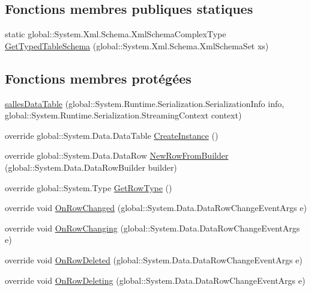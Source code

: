 \subsection*{Fonctions membres publiques statiques}
\begin{DoxyCompactItemize}
\item 
static global\+::\+System.\+Xml.\+Schema.\+Xml\+Schema\+Complex\+Type \hyperlink{classforma_1_1formadb_data_set_1_1salles_data_table_a2fcffe6ed729e31e3caee308d060d0a1}{Get\+Typed\+Table\+Schema} (global\+::\+System.\+Xml.\+Schema.\+Xml\+Schema\+Set xs)
\end{DoxyCompactItemize}
\subsection*{Fonctions membres protégées}
\begin{DoxyCompactItemize}
\item 
\hyperlink{classforma_1_1formadb_data_set_1_1salles_data_table_a02fde9907b075fa5cd7273fd2c7c7926}{salles\+Data\+Table} (global\+::\+System.\+Runtime.\+Serialization.\+Serialization\+Info info, global\+::\+System.\+Runtime.\+Serialization.\+Streaming\+Context context)
\item 
override global\+::\+System.\+Data.\+Data\+Table \hyperlink{classforma_1_1formadb_data_set_1_1salles_data_table_aca16de54b2b8809d6b54d0c87a4a8695}{Create\+Instance} ()
\item 
override global\+::\+System.\+Data.\+Data\+Row \hyperlink{classforma_1_1formadb_data_set_1_1salles_data_table_a450ce2f81189d838f599189f87640924}{New\+Row\+From\+Builder} (global\+::\+System.\+Data.\+Data\+Row\+Builder builder)
\item 
override global\+::\+System.\+Type \hyperlink{classforma_1_1formadb_data_set_1_1salles_data_table_a452ca8ad2dd043a6825a96a853b549bf}{Get\+Row\+Type} ()
\item 
override void \hyperlink{classforma_1_1formadb_data_set_1_1salles_data_table_a28c9f5ee7ee9013e63bb5d3509cdb43e}{On\+Row\+Changed} (global\+::\+System.\+Data.\+Data\+Row\+Change\+Event\+Args e)
\item 
override void \hyperlink{classforma_1_1formadb_data_set_1_1salles_data_table_a91b8e64a6800a6f803a5455349f2524a}{On\+Row\+Changing} (global\+::\+System.\+Data.\+Data\+Row\+Change\+Event\+Args e)
\item 
override void \hyperlink{classforma_1_1formadb_data_set_1_1salles_data_table_ad85a62a650d080540193645e75192c1a}{On\+Row\+Deleted} (global\+::\+System.\+Data.\+Data\+Row\+Change\+Event\+Args e)
\item 
override void \hyperlink{classforma_1_1formadb_data_set_1_1salles_data_table_abc56e269256421eabd572a67c5d534b7}{On\+Row\+Deleting} (global\+::\+System.\+Data.\+Data\+Row\+Change\+Event\+Args e)
\end{DoxyCompactItemize}
